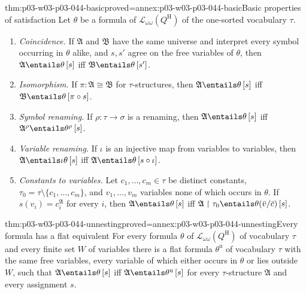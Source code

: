 \begin{hblemma}{thm:p03-w03-p03-044-basic}{proved=annex:p03-w03-p03-044-basic}{Basic properties of satisfaction}
Let \(\theta\) be a formula of \(\mathscr L_{\omega\omega}(Q^{\mathrm H})\)
of the one-sorted vocabulary \(\tau\).
\begin{enumerate}
 \item \emph{Coincidence.}  If \(\mathfrak A\) and \(\mathfrak B\) have the
       same universe and interpret every symbol occurring in \(\theta\)
       alike, and \(s,s'\) agree on the free variables of \(\theta\), then
       \(\mathfrak A\entails\theta\,[s]\) iff
       \(\mathfrak B\entails\theta\,[s']\).
 \item \emph{Isomorphism.}  If \(\pi:\mathfrak A\cong\mathfrak B\) for
       \(\tau\)-structures, then \(\mathfrak A\entails\theta\,[s]\) iff
       \(\mathfrak B\entails\theta\,[\pi\circ s]\).
 \item \emph{Symbol renaming.}  If \(\rho:\tau\to\sigma\) is a renaming,
       then \(\mathfrak A\entails\theta\,[s]\) iff
       \(\mathfrak A^\rho\entails\theta^\rho\,[s]\).
 \item \emph{Variable renaming.}  If \(\iota\) is an injective map from
       variables to variables, then \(\mathfrak A\entails\iota\theta\,[s]\)
       iff \(\mathfrak A\entails\theta\,[s\circ\iota]\).
 \item \emph{Constants to variables.}  Let \(c_1,\ldots,c_m\in\tau\) be
       distinct constants, \(\tau_0=\tau\setminus\{c_1,\ldots,c_m\}\), and
       \(v_1,\ldots,v_m\) variables none of which occurs in \(\theta\).  If
       \(s(v_i)=c_i^{\mathfrak A}\) for every \(i\), then
       \(\mathfrak A\entails\theta\,[s]\) iff
       \(\mathfrak A\restriction\tau_0\entails\theta(\bar v/\bar c)\,[s]\).
\end{enumerate}
\end{hblemma}

\begin{hblemma}{thm:p03-w03-p03-044-unnesting}{proved=annex:p03-w03-p03-044-unnesting}{Every formula has a flat equivalent}
For every formula \(\theta\) of \(\mathscr L_{\omega\omega}(Q^{\mathrm H})\)
of vocabulary \(\tau\) and every finite set \(W\) of variables there is a
flat formula \(\theta^{\mathrm u}\) of vocabulary \(\tau\) with the same
free variables, every variable of which either occurs in \(\theta\) or lies
outside \(W\), such that \(\mathfrak A\entails\theta\,[s]\) iff
\(\mathfrak A\entails\theta^{\mathrm u}\,[s]\) for every \(\tau\)-structure
\(\mathfrak A\) and every assignment \(s\).
\end{hblemma}

